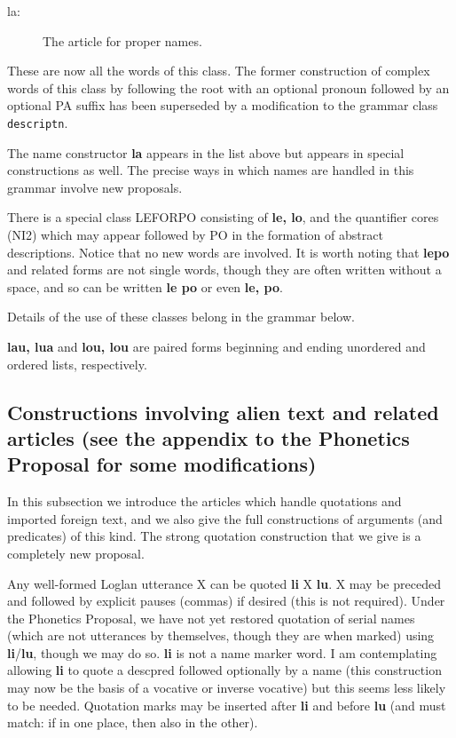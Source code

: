 \documentclass[12pt]{book}
\begin{document}
{\begin{description}
\item[la:]   The article for proper names.
\end{description}


These are now all the words of this class.  The former construction of complex words of this class
by following the root with an optional pronoun followed by an optional PA suffix has been superseded by a modification to the grammar class {\tt descriptn}.

The name constructor {\bf la} appears in the list above but appears in special constructions as well.   The precise ways in which names are handled in this grammar involve new proposals.

There is a special class LEFORPO consisting of {\bf le, lo}, and the quantifier cores (NI2) which may appear
followed by PO in the formation of abstract descriptions.   Notice that no new words are involved.  It is worth noting that {\bf lepo} and related forms are
not single words, though they are often written without a space, and so can be written {\bf le po} or even {\bf le, po}.

Details of the use of these classes belong in the grammar below.

{\bf lau, lua} and {\bf lou, lou} are paired forms beginning and ending unordered and ordered lists, respectively. 

\subsection{Constructions involving alien text and related articles (see the appendix to the Phonetics Proposal for some modifications)}

In this subsection we introduce the articles which handle quotations and imported foreign text, and we also give the full constructions of arguments (and predicates) of this kind.   The strong quotation construction that we give is a completely new proposal.

Any well-formed Loglan utterance X can be quoted {\bf li} X {\bf lu}.  X may be preceded and followed by explicit pauses (commas) if desired (this is not required).  Under the Phonetics Proposal, we have not yet restored quotation of serial names (which are not utterances by themselves, though they are when marked) using {\bf li}/{\bf lu}, though we may do so.  {\bf li} is not a name marker word.
I am contemplating allowing {\bf li} to quote a descpred followed optionally by a name (this construction may now be the basis of a vocative or inverse vocative) but this seems less likely to be needed.  Quotation marks may be inserted after {\bf li} and before {\bf lu} (and must match:  if in one place, then also in the other).

}
\end{document}
